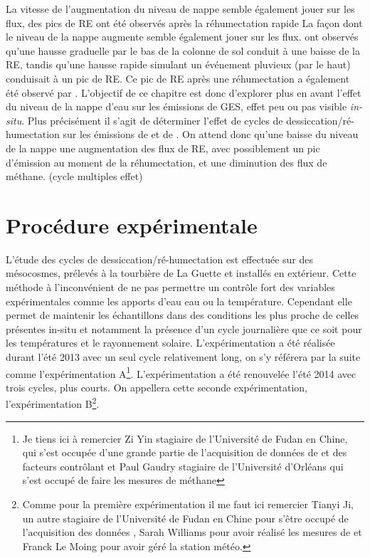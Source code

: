 La vitesse de l'augmentation du niveau de nappe semble également jouer sur les flux, des pics de RE ont été observés après la réhumectation rapide 
La façon dont le niveau de la nappe augmente semble également jouer sur les flux.
\citet{strack2009} ont observés qu'une hausse graduelle par le bas de la colonne de sol conduit à une baisse de la RE, tandis qu'une hausse rapide simulant un événement pluvieux (par le haut) conduisait à un pic de RE.
Ce pic de RE après une réhumectation a également été observé par \citet{mcneil2003}.
L'objectif de ce chapitre est donc d'explorer plus en avant l'effet du niveau de la nappe d'eau sur les émissions de GES, effet peu ou pas visible \textit{in-situ}.
Plus précisément il s'agit de déterminer l'effet de cycles de dessiccation/ré-humectation sur les émissions de \coo et de \chh. 
On attend donc qu'une baisse du niveau de la nappe une augmentation des flux de RE, avec possiblement un pic d'émission au moment de la réhumectation, et une diminution des flux de méthane.
(\plop cycle multiples effet)

\section{Procédure expérimentale}

L'étude des cycles de dessiccation/ré-humectation est effectuée sur des mésocosmes, prélevés à la tourbière de La Guette et installés en extérieur.
Cette méthode à l'inconvénient de ne pas permettre un contrôle fort des variables expérimentales comme les apports d'eau eau ou la température.
Cependant elle permet de maintenir les échantillons dans des conditions les plus proche de celles présentes in-situ et notamment la présence d'un cycle journalière que ce soit pour les températures et le rayonnement solaire.
L'expérimentation a été réalisée durant l'été 2013 avec un seul cycle relativement long, on s'y référera par la suite comme l'expérimentation A\footnote{Je tiens ici à remercier Zi Yin stagiaire de l'Université de Fudan en Chine, qui s'est occupée d'une grande partie de l'acquisition de données de \coo et des facteurs contrôlant et Paul Gaudry stagiaire de l'Université d'Orléans qui s'est occupé de faire les mesures de méthane}.
L'expérimentation a été renouvelée l'été 2014 avec trois cycles, plus courts.
On appellera cette seconde expérimentation, l'expérimentation B\footnote{Comme pour la première expérimentation il me faut ici remercier Tianyi Ji, un autre stagiaire de l'Université de Fudan en Chine pour s'être occupé de l'acquisition des données \coo, Sarah Williams pour avoir réalisé les mesures de \chh et Franck Le Moing pour avoir géré la station météo.}.

